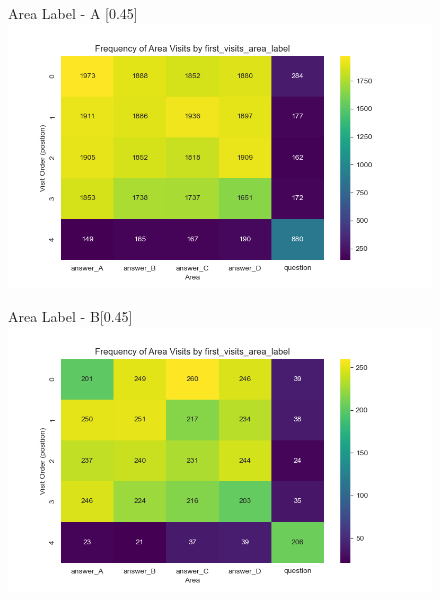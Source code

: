 \documentclass[manuscript,review,anonymous]{acmart}
\begin{document}
        \begin{figure}[htbp]
          \centering
          \begin{subcaptionbox}{Area Label - A \label{fig:aa}}[0.45\textwidth]
            {\centering\includegraphics[width=\linewidth]{plots/visits/matrix__first_visits_area_label_hunters_A.png}}
          \end{subcaptionbox}
          \hfill
          \begin{subcaptionbox}{Area Label - B\label{fig:bb}}[0.45\textwidth]
            {\centering\includegraphics[width=\linewidth]{plots/visits/matrix__first_visits_area_label_hunters_B.png}}
          \end{subcaptionbox}
          
          \medskip
        

\end{figure}
\end{document}
